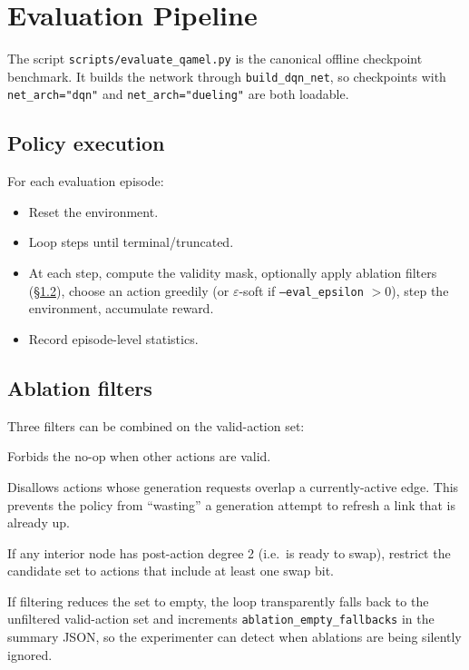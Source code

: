 \documentclass[11pt]{article}
\newcommand{\code}[1]{\texttt{#1}}
\newcommand{\file}[1]{\texttt{\small #1}}
\begin{document}
\section{Evaluation Pipeline}
\label{sec:eval}

The script \file{scripts/evaluate\_qamel.py} is the canonical offline checkpoint benchmark. It builds the network through \code{build\_dqn\_net}, so checkpoints with \code{net\_arch="dqn"} and \code{net\_arch="dueling"} are both loadable.

\subsection{Policy execution}
For each evaluation episode:
\begin{itemize}
  \item Reset the environment.
  \item Loop steps until terminal/truncated.
  \item At each step, compute the validity mask, optionally apply ablation filters (\S\ref{sec:ablations}), choose an action greedily (or $\varepsilon$-soft if \code{--eval\_epsilon} $>0$), step the environment, accumulate reward.
  \item Record episode-level statistics.
\end{itemize}

\subsection{Ablation filters}
\label{sec:ablations}
Three filters can be combined on the valid-action set:
\begin{description}[leftmargin=2em]
  \item[\code{--mask\_null\_action}] Forbids the no-op when other actions are valid.
  \item[\code{--block\_refresh\_actions}] Disallows actions whose generation requests overlap a currently-active edge. This prevents the policy from ``wasting'' a generation attempt to refresh a link that is already up.
  \item[\code{--prefer\_swap\_when\_ready}] If any interior node has post-action degree 2 (i.e.\ is ready to swap), restrict the candidate set to actions that include at least one swap bit.
\end{description}
If filtering reduces the set to empty, the loop transparently falls back to the unfiltered valid-action set and increments \code{ablation\_empty\_fallbacks} in the summary JSON, so the experimenter can detect when ablations are being silently ignored.
\end{document}
